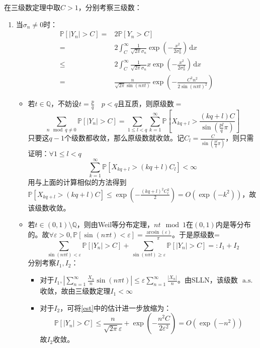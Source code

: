 \documentclass{ctexart}
\begin{document}
在三级数定理中取$C>1$，分别考察三级数：
\begin{enumerate}
\item 当$\sigma_n\neq 0$时：
\begin{align}\label{est}
  \mathbb{P}\left[ |Y_n|>C \right]=& 2\mathbb{P}\left[ Y_n>C \right]\\
  =& 2\int_{C}^{\infty} \frac{1}{\sqrt{2\pi}\sigma_n}\exp(-\frac{x^2}{2\sigma_n^2}) \,\mathrm{d}x\\
  \leq& 2\int_{C}^{\infty} \frac{1}{\sqrt{2\pi}\sigma_n}x\exp(-\frac{x^2}{2\sigma_n^2}) \,\mathrm{d}x\\
  =& \frac{n}{\sqrt{2\pi}\sin(n\pi t)}\exp(-\frac{C^2n^2}{2\sin(n\pi t)^2})
\end{align}
\begin{itemize}
\item 若$t\in\mathbb{Q}$，不妨设$t=\frac{p}{q} \quad p<q$且互质，则原级数$=$
  \[\sum\limits_{n \mod{q}\neq 0}^{}\mathbb{P}\left[ |Y_n|>C \right]=\sum\limits_{1\leq l<q}\sum\limits_{k=1}^{\infty}\mathbb{P}\left[ X_{kq+l}>\frac{(kq+l)C}{\sin(\frac{pl}{q}\pi)} \right]\]
  只要这$q-1$个级数都收敛，那么原级数就收敛。记$C_l=\frac{C}{\sin(\frac{pl}{q}\pi)}$，则只需证明：$\forall 1\leq l<q$
  \begin{equation*}
\sum\limits_{k=1}^{\infty}\mathbb{P}\left[ X_{kq+l}>(kq+l)C_l \right]<\infty
\end{equation*}
用与上面的计算相似的方法得到$\mathbb{P}\left[ X_{kq+l}>(kq+l)C \right]\leq \exp(-\frac{(kq+l)^2C_l^2}{2})=O(\exp(-k^2))$，故该级数收敛。
\item 若$t\in (0,1)\setminus \mathbb{Q}$，则由Weil等分布定理，$nt\mod 1$在$(0,1)$内是等分布的。故$\forall \varepsilon>0, \mathbb{P}\left[ \sin(n\pi t)<\varepsilon\right]=\frac{\arcsin(\varepsilon)}{\pi}$。于是原级数=
  \begin{equation*}
\sum\limits_{\sin(n\pi t)<\varepsilon}^{}\mathbb{P}\left[ |Y_n|>C \right]+\sum\limits_{\sin(n\pi t)\geq \varepsilon}^{}\mathbb{P}\left[ |Y_n| >C\right]=: I_1+I_2
  \end{equation*}
分别考察$I_1,I_2$：
\begin{itemize}
\item 对于$I_1, |\sum\limits_{n=1}^{\infty}\frac{X_n}{n}\sin(n\pi t)|\leq \varepsilon \sum\limits_{n=1}^{\infty} \frac{|X_n|}{n}$。由SLLN，该级数 $\text{ a.s. }$收敛，故由三级数定理$I_1<\infty$
\item 对于$I_2$，可将\ref{est}中的估计进一步放缩为：
  \begin{equation*}
\mathbb{P}\left[ |Y_n| >C\right]\leq \frac{n}{\sqrt{2\pi}\varepsilon}+\exp(-\frac{n^2C}{2\varepsilon^2})=O(\exp(-n^2))
\end{equation*}
故$I_{2}$收敛。
\end{itemize}


\end{itemize}
\end{enumerate}
\end{document}
